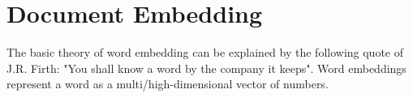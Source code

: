 \documentclass[../../Thesis.tex]{subfiles}
\begin{document}
\section{Document Embedding}
The basic theory of word embedding can be explained by the following quote of J.R. Firth: "You shall know a word by the company it keeps". Word embeddings represent a word as a multi/high-dimensional vector of numbers. 
\end{document}
